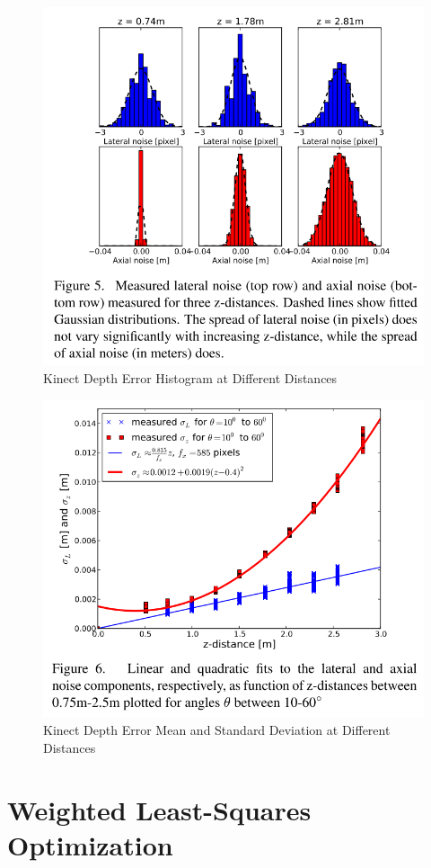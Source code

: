 \documentclass[a4paper]{report}
\numberwithin{figure}{section}
\begin{document}
\begin{figure}[H]
	\centering
  \includegraphics[width=0.7\linewidth,natwidth=640,natheight=640]
  {fig/ref_imgs/kinect_noise_hist.png}
  \caption{Kinect Depth Error Histogram at Different Distances}
	\label{fig:kinect_depth_lateral_noise}
\end{figure}

\begin{figure}[H]
	\centering
  \includegraphics[width=0.7\linewidth,natwidth=640,natheight=640]
  {fig/ref_imgs/kinect_noise_std_diff_distances.png}
  \caption{Kinect Depth Error Mean and Standard Deviation at Different Distances}
	\label{fig:kinect_depth_lateral_noise}
\end{figure}





\section{Weighted Least-Squares Optimization} \label{sc_weighted_lsq}
\end{document}
